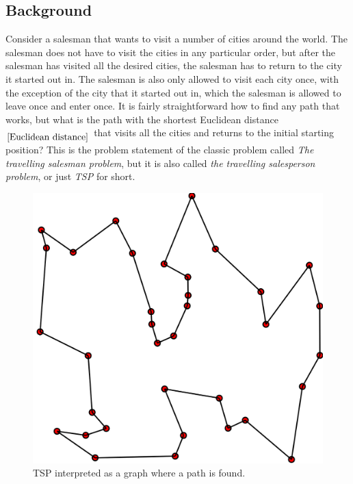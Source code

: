 \documentclass{article}
\begin{document}
\subsection{Background}\label{Background}
Consider a salesman that wants to visit a number of cities around the world. The salesman does not have to visit the cities in any particular order, but after the salesman has visited all the desired cities, the salesman has to return to the city it started out in. The salesman is also only allowed to visit each city once, with the exception of the city that it started out in, which the salesman is allowed to leave once and enter once. It is fairly straightforward how to find any path that works, but what is the path with the shortest Euclidean distance$_{\ref{Euclidean distance}}$ that visits all the cities and returns to the initial starting position?
This is the problem statement of the classic problem called \textit{The travelling salesman problem}, but it is also called \textit{the travelling salesperson problem}, or just \textit{TSP} for short.


\begin{figure}[ht]
 \centering
 \includegraphics[scale=.15]{docs/pictures/tsp.png}
 \caption{TSP interpreted as a graph where a path is found. \cite{wiki:TSP}}
 \label{Figure:TSP-as-graph}
\end{figure}
\end{document}

